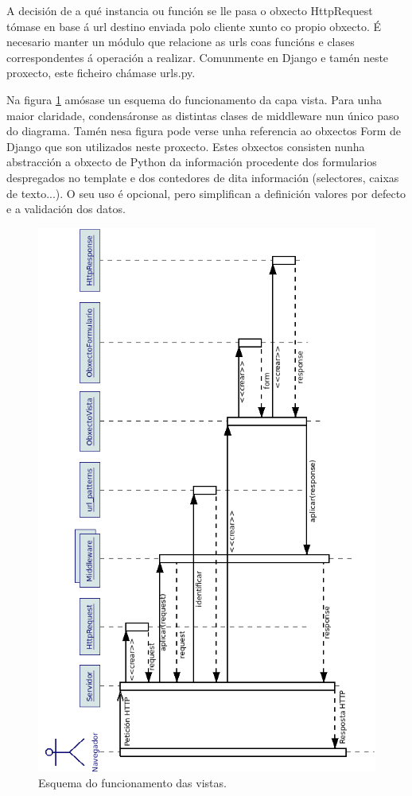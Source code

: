 A decisión de a qué instancia ou función se lle pasa o obxecto HttpRequest tómase en base á url destino enviada polo cliente xunto co propio obxecto. É necesario manter un módulo que relacione as urls coas funcións e clases correspondentes á operación a realizar. Comunmente en Django e tamén neste proxecto, este ficheiro chámase urls.py.

Na figura \ref{fig:vista} amósase un esquema do funcionamento da capa vista. Para unha maior claridade, condensáronse as distintas clases de middleware nun único paso do diagrama. Tamén nesa figura pode verse unha referencia ao obxectos Form de Django que son utilizados neste proxecto. Estes obxectos consisten nunha abstracción a obxecto de Python da información procedente dos formularios despregados no template e dos contedores de dita información (selectores, caixas de texto...). O seu uso é opcional, pero simplifican a definición valores por defecto e a validación dos datos. 

\begin{figure}[h]
	\centering
	\includegraphics[scale=0.6,keepaspectratio=true]{./images/secuencia_vista_v.png}
	\caption{Esquema do funcionamento das vistas.}
	\label{fig:vista}
\end{figure} 



